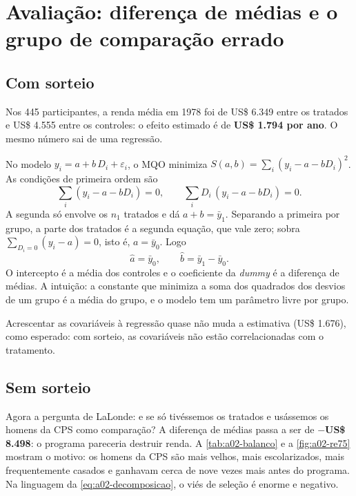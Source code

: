 \section{Avaliação: diferença de médias e o grupo de comparação errado}

\subsection{Com sorteio}

Nos 445 participantes, a renda média em 1978 foi de US\$ 6.349 entre os
tratados e US\$ 4.555 entre os controles: o efeito estimado é de
\textbf{US\$ 1.794 por ano}. O mesmo número sai de uma regressão.

\begin{exemplo}[title={Diferença de médias = MQO com uma \emph{dummy}}]
No modelo $y_i = a + b\,D_i + \varepsilon_i$, o MQO minimiza
$S(a,b) = \sum_i (y_i - a - b D_i)^2$. As condições de primeira ordem são
\begin{equation}\label{eq:a02-cpo}
  \sum_{i} (y_i - a - b D_i) = 0, \qquad \sum_{i} D_i\,(y_i - a - b D_i) = 0 .
\end{equation}
A segunda só envolve os $n_1$ tratados e dá $a + b = \bar y_1$. Separando a
primeira por grupo, a parte dos tratados é a segunda equação, que vale zero; sobra
$\sum_{D_i=0}(y_i - a) = 0$, isto é, $a = \bar y_0$. Logo
\[
  \hat a = \bar y_0, \qquad \hat b = \bar y_1 - \bar y_0 .
\]
O intercepto é a média dos controles e o coeficiente da \emph{dummy} é a
diferença de médias. A intuição: a constante que minimiza a soma dos quadrados
dos desvios de um grupo é a média do grupo, e o modelo tem um parâmetro livre
por grupo.
\end{exemplo}

Acrescentar as covariáveis à regressão quase não muda a estimativa (US\$ 1.676),
como esperado: com sorteio, as covariáveis não estão correlacionadas com o
tratamento.

\subsection{Sem sorteio}

Agora a pergunta de LaLonde: e se só tivéssemos os tratados e usássemos os
homens da CPS como comparação? A diferença de médias passa a ser de
\textbf{$-$US\$ 8.498}: o programa pareceria destruir renda. A
\cref{tab:a02-balanco} e a \cref{fig:a02-re75} mostram o motivo: os homens da
CPS são mais velhos, mais escolarizados, mais frequentemente casados e ganhavam
cerca de nove vezes mais antes do programa. Na linguagem da
\cref{eq:a02-decomposicao}, o viés de seleção é enorme e negativo.


